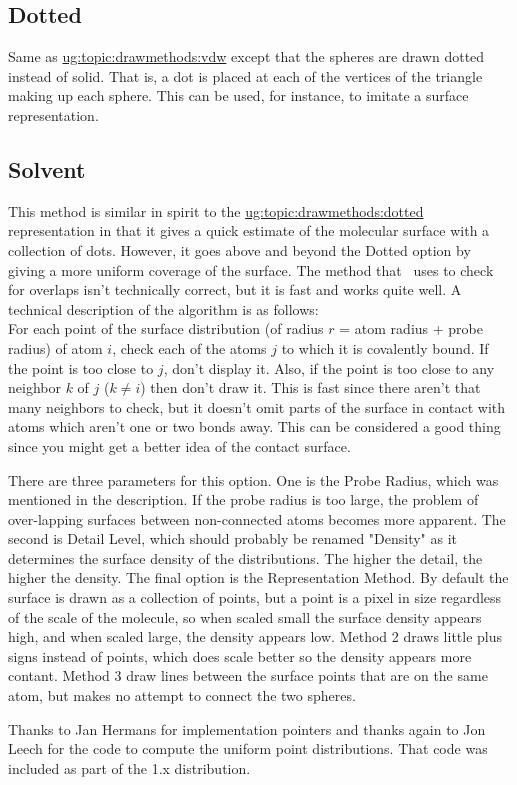 \subsection{Dotted}
\label{ug:topic:drawmethods:dotted}
Same as \hyperref{`VDW'}{`VDW' [\S~}{]}{ug:topic:drawmethods:vdw} except
that the spheres are drawn dotted instead of solid.  That is, a dot is
placed at each of the vertices of the triangle making up each sphere.  This
can be used, for instance, to imitate a surface representation.


\subsection{Solvent}
This method is similar in spirit to the \hyperref{`Dotted'}{`Dotted'
[\S~}{]}{ug:topic:drawmethods:dotted} representation in that
it gives a quick estimate of the molecular surface with a collection
of dots.  However, it goes above and beyond the Dotted option by
giving a more uniform coverage of the surface.  The method that \VMD\
uses to check for overlaps isn't technically correct, but it is fast
and works quite well.  A technical description of the algorithm is as
follows: \\

For each point of the surface distribution (of radius $r$ = atom radius
+ probe radius) of atom $i$, check each of the atoms $j$ to which it is
covalently bound.  If the point is too close to $j$, don't display it.
Also, if the point is too close to any neighbor $k$ of $j$ ($k \neq i$) then
don't draw it.  This is fast since there aren't that many neighbors to
check, but it doesn't omit parts of the surface in contact with atoms
which aren't one or two bonds away.  This can be considered a good
thing since you might get a better idea of the contact surface.

There are three parameters for this option.  One is the {\sf Probe Radius},
which was mentioned in the description.  If the probe radius is too large,
the problem of over-lapping surfaces between non-connected atoms becomes
more apparent.  The second is {\sf Detail Level}, which should probably be
renamed "Density" as it determines the surface density of the distributions.
The higher the detail, the higher the density.  The final option is the {\sf
Representation Method}.  By default the surface is drawn as a collection of
points, but a point is a pixel in size regardless of the scale of the
molecule, so when scaled small the surface density appears high, and when
scaled large, the density appears low.  Method 2 draws little plus signs
instead of points, which does scale better so the density appears more
contant.  Method 3 draw lines between the surface points that are on the
same atom, but makes no attempt to connect the two spheres.

Thanks to Jan Hermans for implementation pointers and thanks again to
Jon Leech for the code to compute the uniform point distributions.  That
code was included as part of the 1.x distribution.

